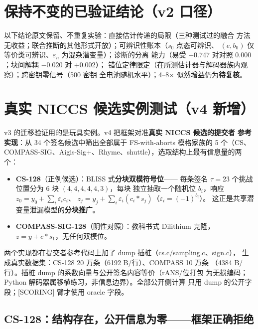 \documentclass[11pt,a4paper]{ctexart}
\begin{document}
\section{保持不变的已验证结论（v2 口径）}

以下结论原文保留、不重复实验：直接估计传递的局限（三种测试过的融合
方法无收益；联合推断的其他形式开放）；可辨识性账本（$s_0$ 点态可辨识、
$(e,b_0)$ 仅等价类可辨识、$\varepsilon_n$ 为混杂潜变量）；诊断的分离
能力（易受 $+0.747$ 对对照 $0.000$；块间解耦 $-0.020$ 对 $+0.002$）；
错位定律限定（在所测估计器与解码器族内观察）；跨密钥零信号（500 密钥
全电池随机水平）；4--8$\times$ 似然增益仍为\textbf{待复核}。

\section{真实 NICCS 候选实例测试（v4 新增）}

v3 的迁移验证用的是玩具实例。v4 把框架对准\textbf{真实 NICCS 候选的提交者
参考实现}：从 34 个签名候选中筛出全部属于 FS-with-aborts 模格家族的
5 个（CS、COMPASS-SIG、Aigis-Sig+、Rhyme、shuttle），选取结构上最有信息量的两个：

\begin{itemize}
  \item \textbf{CS-128}（正例候选）：BLISS 式\textbf{分块双模符号位}——
        每条签名 $\tau{=}23$ 个挑战位置分为 6 块 $(4,4,4,4,4,3)$，每块
        独立抽取一个随机位 $b_i$，响应 $z_0=y_0+\sum_i\varepsilon_i c_i$、
        $z_j=y_j+\sum_i\varepsilon_i(c_i{\ast}s_j)$（$\varepsilon_i=(-1)^{b_i}$）。
        这正是共享潜变量泄漏模型的\textbf{分块推广}。
  \item \textbf{COMPASS-SIG-128}（阴性对照）：教科书式 Dilithium 克隆，
        $z=y+c{\ast}s_1$，无任何双模位。
\end{itemize}

两个实现都在提交者参考代码上加了 dump 插桩（cs.c/sampling.c、sign.c），
生成真实数据集：CS-128 20 万条（6192 B/行）、COMPASS 10 万条
（4384 B/行）。插桩 dump 的系数向量与公开签名内容等价（rANS/位打包
为无损编码；Python 解码器属移植练习，非信息边界）。全部公开侧计算
只用 dump 的公开字段；[SCORING] 臂才使用 oracle 字段。

\subsection{CS-128：结构存在，公开信息为零——框架正确拒绝}
\end{document}
